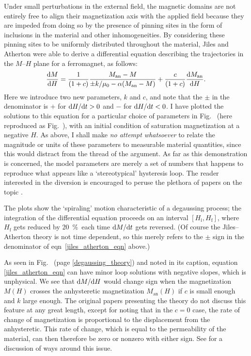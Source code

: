 Under small perturbations in the external field, the magnetic domains are not
entirely free to align their magnetization axis with the applied field because
they are impeded from doing so by the presence of pinning sites in the form of
inclusions in the material and other inhomogeneities. By considering these
pinning sites to be uniformly distributed throughout the material,
Jiles and Atherton \cite{jiles1986theory} were able to derive a differential
equation describing the trajectories in the $M$--$H$ plane for a ferromagnet, as
follows:
%
\begin{align}
   \label{jiles_atherton_eqn}
   \frac{\mathrm{d} M}{\mathrm{d} H}=\frac{1}{(1+c)}\frac{M_\text{an}-M}{\pm
   k/\mu_0-\alpha(M_\text{an}-M)}+\frac{c}{(1+c)}\frac{\mathrm{d} M_\text{an}}{\mathrm{d} H}.
\end{align}
%
Here we introduce two new parameters, $k$ and $c$, and note that the $\pm$ in
the denominator is $+$ for $\mathrm{d} H/\mathrm{d} t>0$ and $-$ for $\mathrm{d} H/\mathrm{d} t<0$. I have
plotted the solutions to this equation for a particular choice of parameters in
Fig.~ (here reproduced as Fig.~),
with an initial condition of saturation magnetization at a negative $H$. As
above, I shall make \emph{no attempt whatsoever} to relate the magnitude or
units of these parameters to measurable material quantities, since this would
distract from the thread of the argument.  As far as this demonstration is
concerned, the model parameters are merely a set of numbers that happens to
reproduce what appears like a `stereotypical' hysteresis loop. The reader
interested in the diversion is encouraged to peruse the plethora of papers on the
topic \cite{jiles1983ferromagnetic, jiles1984theory, jiles1986theory,
lewis1996modeling}.

The plots show the `spiraling' motion characteristic of a degaussing process;
the integration of the differential equation proceeds on an interval
$[H_\text{i},H_\text{f}]$, where $H_\text{f}$ gets reduced by 20~\%\ each time
$\mathrm{d} M/\mathrm{d} t$ gets reversed. (Of course the Jiles--Atherton theory is not time
dependent, so this merely refers to the $\pm$ sign in the denominator of
eqn~\ref{jiles_atherton_eqn} above.)

As seen in Fig.~ (page \ref{degaussing_theory}) and
noted in its caption, equation \ref{jiles_atherton_eqn} can have minor loop
solutions with negative slopes, which is unphysical. We see that $\mathrm{d} M/\mathrm{d} H$
would change sign when the magnetization $M(H)$ crosses the anhysteretic
magnetization $M_\text{an}(H)$ if $c$ is small enough and $k$ large enough. The
original papers presenting the theory
\cite{jiles1983ferromagnetic,jiles1984theory,jiles1986theory} do not discuss
this feature at any great length, except for noting that in the $c=0$ case, the
rate of change of magnetization is proportional to the displacement from the
anhysteretic. This rate of change, which is equal to the permeability of the
material, can then therefore be zero or nonzero with either sign. See
\cite{carpenter1991differential} for a discussion of ways around this issue.

